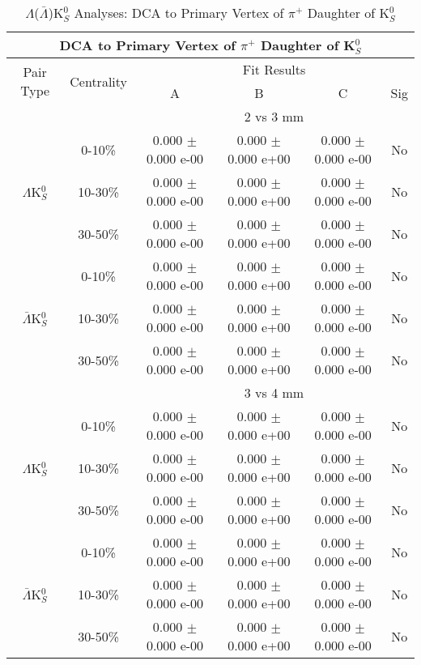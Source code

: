 \documentclass[../AnalysisNoteJBuxton.tex]{subfiles}
\begin{document}
\begin{table}
 \centering
 \begin{tabular}{|c|c|c|c|c|c|}
  \multicolumn{6}{c}{DCA to Primary Vertex of $\pi^{+}$ Daughter of K$^{0}_{S}$} \\
  \hline
  \multirow{2}{*}{Pair Type} & \multirow{2}{*}{Centrality} & \multicolumn{4}{c|}{Fit Results} \\
  \cline{3-6}
   & & A & B & C & Sig \\  
  \hline
  \multicolumn{2}{|c}{} & \multicolumn{4}{c|}{2 vs 3 mm} \\  
  \hline  
  \multirow{3}{*}{$\Lambda$K$^{0}_{S}$}
   &  0-10\% & 0.000 $\pm$ 0.000 e-00 & 0.000 $\pm$ 0.000 e+00 & 0.000 $\pm$ 0.000 e-00 & No \\
   & 10-30\% & 0.000 $\pm$ 0.000 e-00 & 0.000 $\pm$ 0.000 e+00 & 0.000 $\pm$ 0.000 e-00 & No \\
   & 30-50\% & 0.000 $\pm$ 0.000 e-00 & 0.000 $\pm$ 0.000 e+00 & 0.000 $\pm$ 0.000 e-00 & No \\
  \hline
  \multirow{3}{*}{$\bar{\Lambda}$K$^{0}_{S}$}  
   &  0-10\% & 0.000 $\pm$ 0.000 e-00 & 0.000 $\pm$ 0.000 e+00 & 0.000 $\pm$ 0.000 e-00 & No \\
   & 10-30\% & 0.000 $\pm$ 0.000 e-00 & 0.000 $\pm$ 0.000 e+00 & 0.000 $\pm$ 0.000 e-00 & No \\
   & 30-50\% & 0.000 $\pm$ 0.000 e-00 & 0.000 $\pm$ 0.000 e+00 & 0.000 $\pm$ 0.000 e-00 & No \\
  \hline 
  \multicolumn{2}{|c}{} & \multicolumn{4}{c|}{3 vs 4 mm} \\
  \hline  
  \multirow{3}{*}{$\Lambda$K$^{0}_{S}$}   
   &  0-10\% & 0.000 $\pm$ 0.000 e-00 & 0.000 $\pm$ 0.000 e+00 & 0.000 $\pm$ 0.000 e-00 & No \\
   & 10-30\% & 0.000 $\pm$ 0.000 e-00 & 0.000 $\pm$ 0.000 e+00 & 0.000 $\pm$ 0.000 e-00 & No \\
   & 30-50\% & 0.000 $\pm$ 0.000 e-00 & 0.000 $\pm$ 0.000 e+00 & 0.000 $\pm$ 0.000 e-00 & No \\
  \hline  
  \multirow{3}{*}{$\bar{\Lambda}$K$^{0}_{S}$}
   &  0-10\% & 0.000 $\pm$ 0.000 e-00 & 0.000 $\pm$ 0.000 e+00 & 0.000 $\pm$ 0.000 e-00 & No \\
   & 10-30\% & 0.000 $\pm$ 0.000 e-00 & 0.000 $\pm$ 0.000 e+00 & 0.000 $\pm$ 0.000 e-00 & No \\
   & 30-50\% & 0.000 $\pm$ 0.000 e-00 & 0.000 $\pm$ 0.000 e+00 & 0.000 $\pm$ 0.000 e-00 & No \\
  \hline
 \end{tabular}
 \caption{$\Lambda$($\bar{\Lambda}$)K$^{0}_{S}$ Analyses: DCA to Primary Vertex of $\pi^{+}$ Daughter of K$^{0}_{S}$}
 \label{tab:DcaToPrimVertexPosPionDaughtOfK0LamK0Full}
\end{table}
\end{document}
